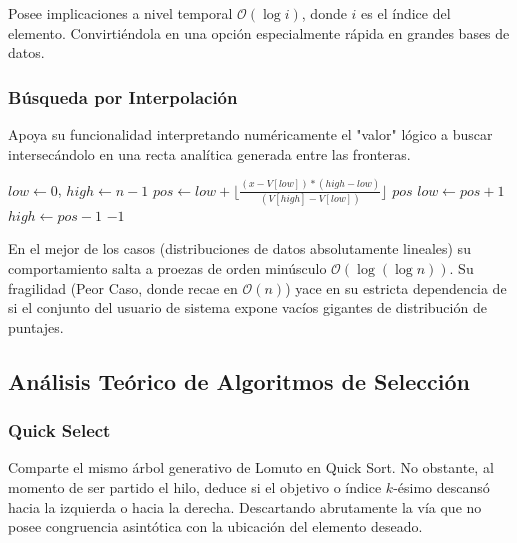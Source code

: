 Posee implicaciones a nivel temporal $\mathcal{O}(\log i)$, donde $i$ es el índice del elemento. Convirtiéndola en una opción especialmente rápida en grandes bases de datos.

\subsubsection{Búsqueda por Interpolación}\label{sec:busqueda_interpolacion}
Apoya su funcionalidad interpretando numéricamente el "valor" lógico a buscar intersecándolo en una recta analítica generada entre las fronteras.

\begin{algorithm}[H]
    \caption{Búsqueda por Interpolación}
    \begin{algorithmic}[1]
        \State $low \gets 0$, $high \gets n-1$
            \State $pos \gets low + \lfloor \frac{(x - V[low]) * (high - low)}{(V[high] - V[low])} \rfloor$
             \Return $pos$ \EndIf
             $low \gets pos + 1$ \EndIf
             $high \gets pos - 1$ \EndIf
        \EndWhile
        \Return $-1$
        \EndProcedure
    \end{algorithmic}
\end{algorithm}

En el mejor de los casos (distribuciones de datos absolutamente lineales) su comportamiento salta a proezas de orden minúsculo  $\mathcal{O}(\log(\log n))$. Su fragilidad (Peor Caso, donde recae en $\mathcal{O}(n)$) yace en su estricta dependencia de si el conjunto del usuario de sistema expone vacíos gigantes de distribución de puntajes.

\subsection{Análisis Teórico de Algoritmos de Selección}\label{sec:seleccion_dv}

\subsubsection{Quick Select}\label{sec:quick_select}
Comparte el mismo árbol generativo de Lomuto en Quick Sort. No obstante, al momento de ser partido el hilo, deduce si el objetivo o índice $k$-ésimo descansó hacia la izquierda o hacia la derecha. Descartando abrutamente la vía que no posee congruencia asintótica con la ubicación del elemento deseado.

